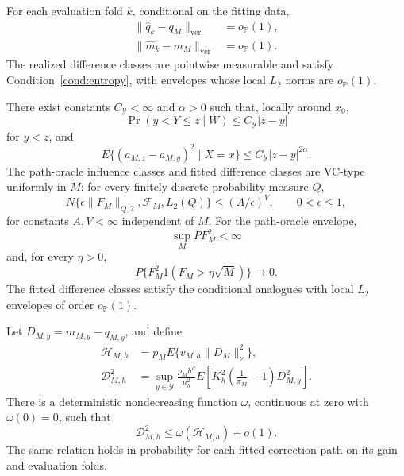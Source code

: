 \begin{assumption}
\label{cond:nuisance}
For each evaluation fold \(k\), conditional on the fitting data,
\begin{align}
\|\widehat q_k-q_M\|_{\mathrm{ver}}
&=o_{\mathbb P}(1),
\label{eq:q-stability}\\
\|\widehat m_k-m_M\|_{\mathrm{ver}}
&=o_{\mathbb P}(1).
\label{eq:m-stability}
\end{align}
The realized difference classes are pointwise measurable and satisfy Condition~\ref{cond:entropy}, with envelopes whose local \(L_2\) norms are \(o_{\mathbb P}(1)\).
\end{assumption}

\begin{assumption}
\label{cond:entropy}
There exist constants \(C_{\mathcal Y}<\infty\) and \(\alpha>0\) such that, locally around \(x_0\),
\begin{equation}
\Pr(y<Y\le z\mid W)\le C_{\mathcal Y}|z-y|
\label{eq:cdf-increment}
\end{equation}
for \(y<z\), and
\begin{equation}
E\{(a_{M,z}-a_{M,y})^2\mid X=x\}
\le C_{\mathcal Y}|z-y|^{2\alpha}.
\label{eq:a-increment}
\end{equation}
The path-oracle influence classes and fitted difference classes are VC-type uniformly in \(M\): for every finitely discrete probability measure \(Q\),
\begin{equation}
N\{\epsilon\|F_M\|_{Q,2},\mathcal F_M,L_2(Q)\}
\le (A/\epsilon)^V,
\qquad 0<\epsilon\le1,
\label{eq:entropy}
\end{equation}
for constants \(A,V<\infty\) independent of \(M\). For the path-oracle envelope,
\[
\sup_M P F_M^2<\infty
\]
and, for every \(\eta>0\),
\begin{equation}
P\{F_M^2 1(F_M>\eta\sqrt M)\}\to0.
\label{eq:envelope-lindeberg}
\end{equation}
The fitted difference classes satisfy the conditional analogues with local \(L_2\) envelopes of order \(o_{\mathbb P}(1)\).
\end{assumption}

\begin{assumption}
\label{cond:path-compatibility}
Let \(D_{M,y}=m_{M,y}-q_{M,y}\), and define
\begin{align*}
\mathcal H_{M,h}
&=
p_ME\{v_{M,h}\|D_M\|_\nu^2\},\\
\mathcal D_{M,h}^2
&=
\sup_{y\in\mathcal Y}
\frac{p_Mh^d}{\mu_h^2}
E\left[
K_h^2
\left(\frac1{\pi_M}-1\right)
D_{M,y}^2
\right].
\end{align*}
There is a deterministic nondecreasing function \(\omega\), continuous at zero with \(\omega(0)=0\), such that
\[
\mathcal D_{M,h}^2
\le \omega(\mathcal H_{M,h})+o(1).
\]
The same relation holds in probability for each fitted correction path on its gain and evaluation folds.
\end{assumption}

